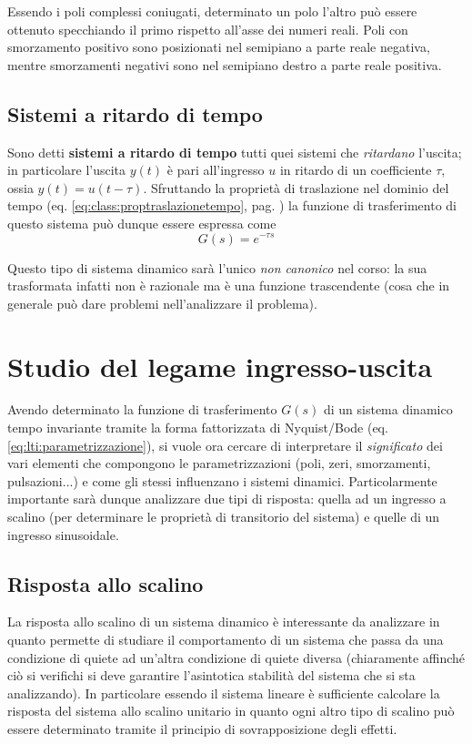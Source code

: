 		Essendo i poli complessi coniugati, determinato un polo l'altro può essere ottenuto specchiando il primo rispetto all'asse dei numeri reali. Poli con smorzamento positivo sono posizionati nel semipiano a parte reale negativa, mentre smorzamenti negativi sono nel semipiano destro a parte reale positiva.
		 
	\subsection{Sistemi a ritardo di tempo}
		\begin{concetto}
			Sono detti \textbf{sistemi a ritardo di tempo} tutti quei sistemi che \textit{ritardano} l'uscita; in particolare l'uscita $y(t)$ è pari all'ingresso $u$ in ritardo di un coefficiente $\tau$, ossia $y(t) = u(t-\tau)$. Sfruttando la proprietà di traslazione nel dominio del tempo (eq. \ref{eq:class:proptraslazionetempo}, pag. \pageref{eq:class:proptraslazionetempo}) la funzione di trasferimento di questo sistema può dunque essere espressa come
			\begin{equation}
				G(s) = e^{-\tau s}
			\end{equation}
		\end{concetto}
		Questo tipo di sistema dinamico sarà l'unico \textit{non canonico} nel corso: la sua trasformata infatti non è razionale ma è una funzione trascendente (cosa che in generale può dare problemi nell'analizzare il problema).	
	
\section{Studio del legame ingresso-uscita}
	Avendo determinato la funzione di trasferimento $G(s)$ di un sistema dinamico tempo invariante tramite la forma fattorizzata di Nyquist/Bode (eq. \ref{eq:lti:parametrizzazione}), si vuole ora cercare di interpretare il \textit{significato} dei vari elementi che compongono le parametrizzazioni (poli, zeri, smorzamenti, pulsazioni...) e come gli stessi influenzano i sistemi dinamici. Particolarmente importante sarà dunque analizzare due tipi di risposta: quella ad un ingresso a scalino (per determinare le proprietà di transitorio del sistema) e quelle di un ingresso sinusoidale.
	
	\subsection{Risposta allo scalino}
		La risposta allo scalino di un sistema dinamico è interessante da analizzare in quanto permette di studiare il comportamento di un sistema che passa da una condizione di quiete ad un'altra condizione di quiete diversa (chiaramente affinché ciò si verifichi si deve garantire l'asintotica stabilità del sistema che si sta analizzando). In particolare essendo il sistema lineare è sufficiente calcolare la risposta del sistema allo scalino unitario in quanto ogni altro tipo di scalino può essere determinato tramite il principio di sovrapposizione degli effetti.
		
